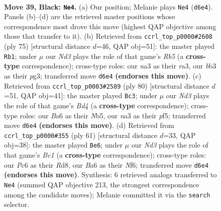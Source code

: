 \documentclass[11pt]{article}
\begin{document}
\clearpage

\begin{figure}[p]\centering
\begin{subfigure}{0.46\textwidth}\centering
\resizebox{\linewidth}{!}{%
\newchessgame
\chessboard[
  setfen={r7/p2p2k1/bppn4/5p1p/1PP2P2/NB6/P2P3P/2R1K3 b - - 3 39},
  showmover=false,
  pgfstyle=straightmove, color=movearrow, markmove={d6-e4}
]}
\caption{}
\end{subfigure}\hfill
\begin{subfigure}{0.46\textwidth}\centering
\resizebox{\linewidth}{!}{%
\newchessgame
\chessboard[
  setfen={4k3/5p1p/3pn1pb/1p6/1r2PP2/R5PP/P5B1/6BK b - - 0 38},
  showmover=false,
  pgfstyle=straightmove, color=movearrow, markmove={b4-b1}
]}
\caption{}
\end{subfigure}
\\[4pt]
\begin{subfigure}{0.46\textwidth}\centering
\resizebox{\linewidth}{!}{%
\newchessgame
\chessboard[
  setfen={8/1kp1bn1r/1p2p3/1N3p2/1P1B1P1p/7P/1P4P1/3R1K2 w - - 11 41},
  showmover=false,
  pgfstyle=straightmove, color=movearrow, markmove={d4-c3}
]}
\caption{}
\end{subfigure}\hfill
\begin{subfigure}{0.46\textwidth}\centering
\resizebox{\linewidth}{!}{%
\newchessgame
\chessboard[
  setfen={2br4/p4p1k/5npp/PpP1p3/4P2N/6PP/2P2PB1/4R1K1 b - - 0 31},
  showmover=false,
  pgfstyle=straightmove, color=movearrow, markmove={c8-e6}
]}
\caption{}
\end{subfigure}
\caption{\textbf{Move 39, Black: \texttt{Ne4}.} (a) Our position; Melanie plays \texttt{Ne4} (\texttt{d6e4}). Panels (b)--(d) are the retrieved master positions whose correspondence most drove this move (highest QAP objective among those that transfer to it). (b) Retrieved from \texttt{ccrl\_top\_p0000\#2608} (ply 75) [structural distance $d$=46, QAP obj=51]: the master played \texttt{Rb1}; under $\mu$ our \emph{Nd3} plays the role of that game's \emph{Rb5} (a \textbf{cross-type} correspondence); cross-type roles: our \emph{n}a3 as their \emph{r}a3, our \emph{b}b3 as their \emph{p}g3; transferred move \texttt{d6e4} \textbf{(endorses this move)}. (c) Retrieved from \texttt{ccrl\_top\_p0003\#2589} (ply 80) [structural distance $d$=51, QAP obj=41]: the master played \texttt{Bc3}; under $\mu$ our \emph{Nd3} plays the role of that game's \emph{Bd4} (a \textbf{cross-type} correspondence); cross-type roles: our \emph{B}a6 as their \emph{N}b5, our \emph{n}a3 as their \emph{p}f5; transferred move \texttt{d6e4} \textbf{(endorses this move)}. (d) Retrieved from \texttt{ccrl\_top\_p0000\#355} (ply 61) [structural distance $d$=33, QAP obj=38]: the master played \texttt{Be6}; under $\mu$ our \emph{Nd3} plays the role of that game's \emph{Bc1} (a \textbf{cross-type} correspondence); cross-type roles: our \emph{P}c6 as their \emph{R}d8, our \emph{B}a6 as their \emph{N}f6; transferred move \texttt{d6e4} \textbf{(endorses this move)}. Synthesis: 6 retrieved analogs transferred to \texttt{Ne4} (summed QAP objective 213, the strongest correspondence among the candidate moves); Melanie committed it via the \texttt{search} selector.}
\label{fig:thought-m77}
\end{figure}
\end{document}
